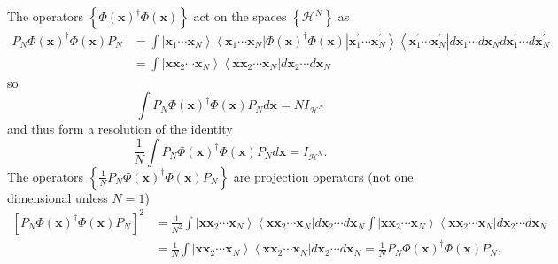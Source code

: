 \documentclass[aps,preprint]{revtex4}%
\begin{document}
The operators $\left\{  \Phi\left(  \mathbf{x}\right)  ^{\dagger}\Phi\left(
\mathbf{x}\right)  \right\}  $ act on the spaces $\left\{  \mathcal{H}%
^{N}\right\}  $ as
\begin{align}
P_{N}\Phi\left(  \mathbf{x}\right)  ^{\dagger}\Phi\left(  \mathbf{x}\right)
P_{N} &  =\int\left\vert \mathbf{x}_{1}\cdots\mathbf{x}_{N}\right\rangle
\left\langle \mathbf{x}_{1}\cdots\mathbf{x}_{N}\right\vert \Phi\left(
\mathbf{x}\right)  ^{\dagger}\Phi\left(  \mathbf{x}\right)  \left\vert
\mathbf{x}_{1}^{\prime}\cdots\mathbf{x}_{N}^{\prime}\right\rangle \left\langle
\mathbf{x}_{1}^{\prime}\cdots\mathbf{x}_{N}^{\prime}\right\vert d\mathbf{x}%
_{1}\cdots d\mathbf{x}_{N}d\mathbf{x}_{1}^{\prime}\cdots d\mathbf{x}%
_{N}^{\prime}\nonumber\\
&  =\int\left\vert \mathbf{xx}_{2}\cdots\mathbf{x}_{N}\right\rangle
\left\langle \mathbf{xx}_{2}\cdots\mathbf{x}_{N}\right\vert d\mathbf{x}%
_{2}\cdots d\mathbf{x}_{N}%
\end{align}
so
\begin{equation}
\int P_{N}\Phi\left(  \mathbf{x}\right)  ^{\dagger}\Phi\left(  \mathbf{x}%
\right)  P_{N}d\mathbf{x}=NI_{\mathcal{H}^{N}}%
\end{equation}
and thus form a resolution of the identity
\begin{equation}
\frac{1}{N}\int P_{N}\Phi\left(  \mathbf{x}\right)  ^{\dagger}\Phi\left(
\mathbf{x}\right)  P_{N}d\mathbf{x}=I_{\mathcal{H}^{N}}.
\end{equation}
The operators $\left\{  \frac{1}{N}P_{N}\Phi\left(  \mathbf{x}\right)
^{\dagger}\Phi\left(  \mathbf{x}\right)  P_{N}\right\}  $ are projection
operators (not one dimensional unless $N=1$)
\begin{align}
\left[  P_{N}\Phi\left(  \mathbf{x}\right)  ^{\dagger}\Phi\left(
\mathbf{x}\right)  P_{N}\right]  ^{2} &  =\frac{1}{N^{2}}\int\left\vert
\mathbf{xx}_{2}\cdots\mathbf{x}_{N}\right\rangle \left\langle \mathbf{xx}%
_{2}\cdots\mathbf{x}_{N}\right\vert d\mathbf{x}_{2}\cdots d\mathbf{x}_{N}%
\int\left\vert \mathbf{xx}_{2}\cdots\mathbf{x}_{N}\right\rangle \left\langle
\mathbf{xx}_{2}\cdots\mathbf{x}_{N}\right\vert d\mathbf{x}_{2}\cdots
d\mathbf{x}_{N}\nonumber\\
&  =\frac{1}{N}\int\left\vert \mathbf{xx}_{2}\cdots\mathbf{x}_{N}\right\rangle
\left\langle \mathbf{xx}_{2}\cdots\mathbf{x}_{N}\right\vert d\mathbf{x}%
_{2}\cdots d\mathbf{x}_{N}=\frac{1}{N}P_{N}\Phi\left(  \mathbf{x}\right)
^{\dagger}\Phi\left(  \mathbf{x}\right)  P_{N},
\end{align}
\end{document}
